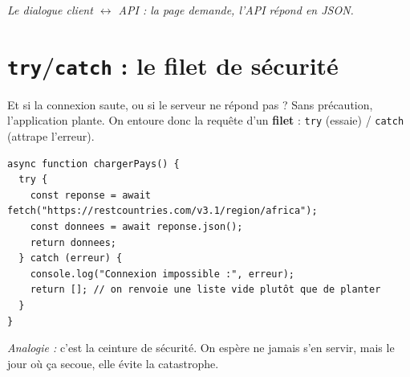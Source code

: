 \documentclass[11pt,a4paper]{article}
\newcommand{\code}[1]{\texttt{#1}}
\begin{document}
\begin{center}

\textit{Le dialogue client $\leftrightarrow$ API : la page demande, l'API répond en JSON.}
\end{center}

\section{\texttt{try}/\texttt{catch} : le filet de sécurité}

Et si la connexion saute, ou si le serveur ne répond pas ? Sans précaution, l'application plante. On entoure donc la requête d'un \textbf{filet} : \code{try} (essaie) / \code{catch} (attrape l'erreur).

\begin{lstlisting}[style=js]
async function chargerPays() {
  try {
    const reponse = await fetch("https://restcountries.com/v3.1/region/africa");
    const donnees = await reponse.json();
    return donnees;
  } catch (erreur) {
    console.log("Connexion impossible :", erreur);
    return []; // on renvoie une liste vide plutôt que de planter
  }
}
\end{lstlisting}

\emph{Analogie :} c'est la ceinture de sécurité. On espère ne jamais s'en servir, mais le jour où ça secoue, elle évite la catastrophe.
\end{document}
